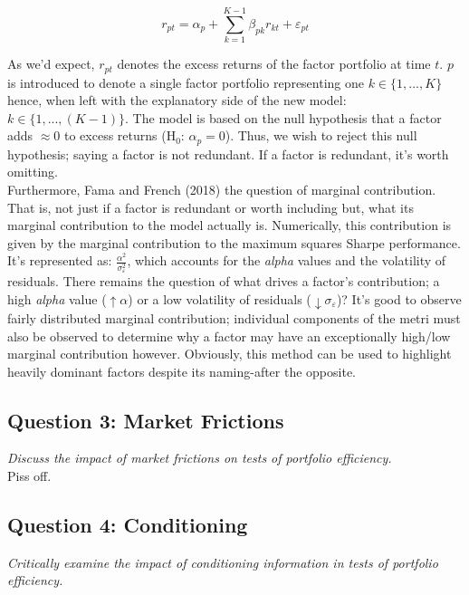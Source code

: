 \documentclass[11pt, english]{article}
\begin{document}
	$$r_{pt}=\alpha_p+\sum_{k=1}^{K-1}\beta_{pk}r_{kt}+\varepsilon_{pt}$$

	As we'd expect, $r_{pt}$ denotes the excess returns of the factor portfolio at time $t$. $p$ is introduced to denote a single factor portfolio representing one $k\in\{1,...,K\}$ hence, when left with the explanatory side of the new model: $k\in\{1,...,(K-1)\}$. The model is based on the null hypothesis that a factor adds $\approx0$ to excess returns (H$_0$: $\alpha_p=0$). Thus, we wish to reject this null hypothesis; saying a factor is not redundant. If a factor is redundant, it's worth omitting.\\

	Furthermore, Fama and French (2018) the question of marginal contribution. That is, not just if a factor is redundant or worth including but, what its marginal contribution to the model actually is. Numerically, this contribution is given by the marginal contribution to the maximum squares Sharpe performance. It's represented as: $\frac{\alpha^2}{\sigma_{\varepsilon}^2}$, which accounts for the \textit{alpha} values and the volatility of residuals. There remains the question of what drives a factor’s contribution; a high \textit{alpha} value ($\uparrow\alpha$) or a low volatility of residuals ($\downarrow\sigma_{\varepsilon}$)? It's good to observe fairly distributed marginal contribution; individual components of the metri must also be observed to determine why a factor may have an exceptionally high/low marginal contribution however. Obviously, this method can be used to highlight heavily dominant factors despite its naming-after the opposite.

	\newpage

	\subsection{Question 3: Market Frictions}
              
	\textit{Discuss the impact of market frictions on tests of portfolio efficiency.}\\

	Piss off.

	\newpage

	\subsection{Question 4: Conditioning}

	\textit{Critically examine the impact of conditioning information in tests of portfolio efficiency.}
\end{document}
